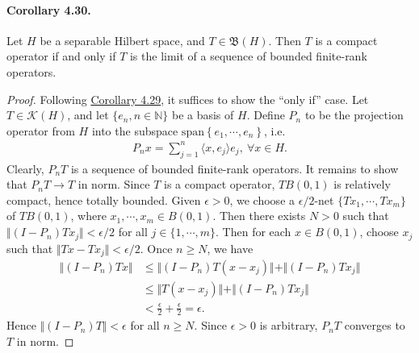 \documentclass{article}
\begin{document}
\paragraph{Corollary 4.30.\label{cor:4.30}} Let $H$ be a separable Hilbert space, and $T\in\mathfrak{B}(H)$. Then $T$ is a compact operator if and only if $T$ is the limit of a sequence of bounded finite-rank operators.
\begin{proof}
Following \hyperref[cor:4.29]{Corollary 4.29}, it suffices to show the ``only if'' case. Let $T\in\mathcal{K}(H)$, and let $\{e_n,n\in\mathbb{N}\}$ be a basis of $H$. Define $P_n$ to be the projection operator from $H$ into the subspace $\mathrm{span}\left\{e_1,\cdots,e_n\right\}$, i.e.
\begin{align*}
	P_nx=\sum_{j=1}^n\langle x,e_j\rangle e_j,\ \forall x\in H.
\end{align*}
Clearly, $P_nT$ is a sequence of bounded finite-rank operators. It remains to show that $P_nT\to T$ in norm. Since $T$ is a compact operator, $TB(0,1)$ is relatively compact, hence totally bounded. Given $\epsilon>0$, we choose a $\epsilon/2$-net $\{Tx_1,\cdots,Tx_m\}$ of $TB(0,1)$, where $x_1,\cdots,x_m\in B(0,1)$. Then there exists $N>0$ such that $\Vert (I-P_n)Tx_j\Vert < \epsilon/2$ for all $j\in\{1,\cdots,m\}$. Then for each $x\in B(0,1)$, choose $x_j$ such that $\Vert Tx-Tx_j\Vert < \epsilon/2$. Once $n\geq N$, we have
\begin{align*}
	\Vert(I-P_n)Tx\Vert &\leq \Vert (I-P_n)T(x-x_j)\Vert + \Vert (I-P_n)Tx_j\Vert\\
	&\leq \Vert T(x-x_j)\Vert + \Vert (I-P_n)Tx_j\Vert\\
	&< \frac{\epsilon}{2} + \frac{\epsilon}{2} = \epsilon.
\end{align*}
Hence $\Vert(I-P_n)T\Vert < \epsilon$ for all $n\geq N$. Since $\epsilon>0$ is arbitrary, $P_nT$ converges to $T$ in norm.
\end{proof}
\end{document}
